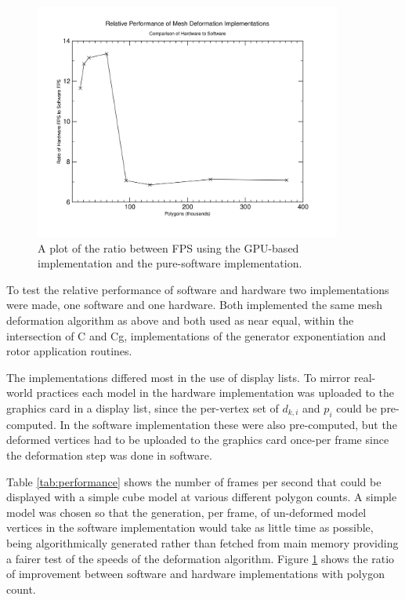 \begin{figure}[p]
\centering
\includegraphics[width=0.9\textwidth]{performance}
\caption{\label{fig:performance}A plot of the ratio between FPS using the
GPU-based implementation and the pure-software implementation.}
\end{figure}

To test the relative performance of software and hardware two implementations
were made, one software and one hardware. Both implemented the same mesh deformation
algorithm as above and both used as near equal, within the intersection of C and
Cg, implementations of the generator exponentiation and rotor application
routines.

The implementations differed most in the use of display lists. To mirror real-world
practices each model in the hardware implementation was uploaded to the graphics
card in a display list, since the per-vertex set of $d_{k,i}$ and $p_i$ could
be pre-computed. In the software implementation these were also pre-computed, but the
deformed vertices had to be uploaded to the graphics card once-per frame since the
deformation step was done in software.

Table \ref{tab:performance} shows the number of frames per second that could be
displayed with a simple cube model at various different polygon counts. A simple model
was chosen so that the generation, per frame, of un-deformed model vertices in the
software implementation would take as little time as possible, being 
algorithmically generated rather than fetched from main memory providing a fairer
test of the speeds of the deformation algorithm. Figure \ref{fig:performance} shows
the ratio of improvement between software and hardware implementations with polygon
count.


